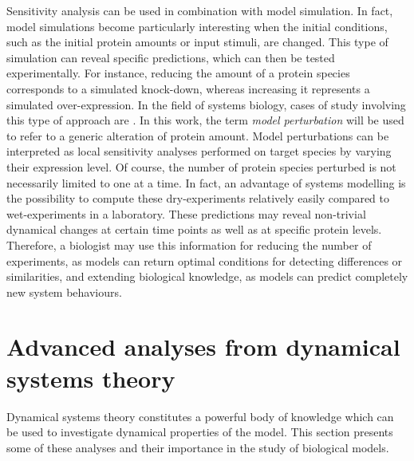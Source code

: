 Sensitivity analysis can be used in combination with model simulation. In fact, model simulations become particularly interesting when the initial conditions, such as the initial protein amounts or input stimuli, are changed. This type of simulation can reveal specific predictions, which can then be tested experimentally. For instance, reducing the amount of a protein species corresponds to a simulated knock-down, whereas increasing it represents a simulated over-expression. In the field of systems biology, cases of study involving this type of approach are \citep{Babu2004, Ihekwaba2004, Mahdavi2007, DallePezze2012a}. In this work, the term \emph{model perturbation} will be used to refer to a generic alteration of protein amount. Model perturbations can be interpreted as local sensitivity analyses performed on target species by varying their expression level. Of course, the number of protein species perturbed is not necessarily limited to one at a time. In fact, an advantage of systems modelling is the 
possibility to compute these dry-experiments relatively easily compared to wet-experiments in a laboratory. These predictions may reveal non-trivial dynamical changes at certain time points as well as at specific protein levels. Therefore, a biologist may use this information for reducing the number of experiments, as models can return optimal conditions for detecting differences or similarities, and extending biological knowledge, as models can predict completely new system behaviours. 

\section{Advanced analyses from dynamical systems theory}
\label{sec:Advanced analyses from dynamical systems theory}
Dynamical systems theory constitutes a powerful body of knowledge which can be used to investigate dynamical properties of the model. This section presents some of these analyses and their importance in the study of biological models.
